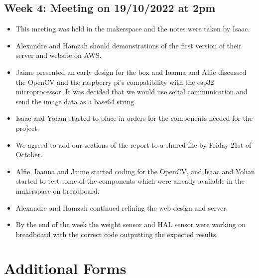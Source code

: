 \subsection*{Week 4: Meeting on 19/10/2022 at 2pm }
\begin{itemize}
    \item This meeting was held in the makerspace and the notes were taken by Isaac. 
    \item Alexandre and Hamzah should demonstrations of the first version of their server and website on AWS. 
    \item Jaime presented an early design for the box and Ioanna and Alfie discussed the OpenCV and the raspberry pi's compatibility with the esp32 microprocessor. It was decided that we would use serial communication and send the image data as a base64 string.  
    \item Isaac and Yohan started to place in orders for the components needed for the project.  
    \item We agreed to add our sections of the report to a shared file by Friday 21st of October. 
    \item Alfie, Ioanna and Jaime started coding for the OpenCV, and Isaac and Yohan started to test some of the components which were already available in the makerspace on breadboard. 
    \item Alexandre and Hamzah continued refining the web design and server. 
    \item By the end of the week the weight sensor and HAL sensor were working on breadboard with the correct code outputting the expected results. 
\end{itemize}

\section{Additional Forms}







